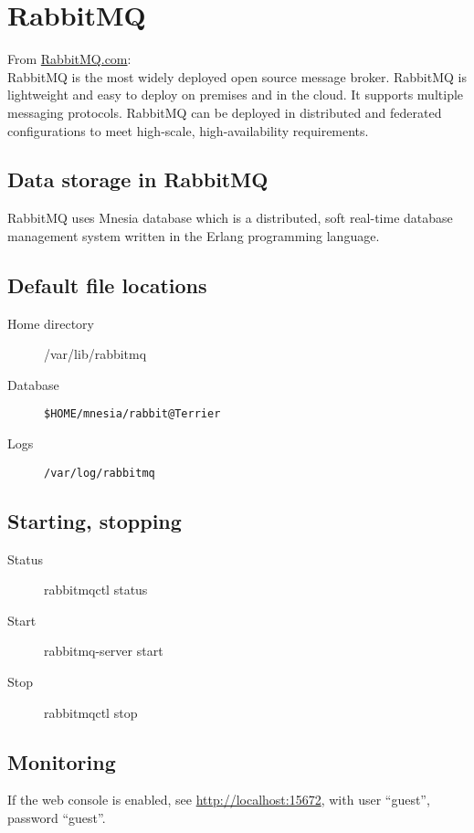 \section{RabbitMQ}
From \href{http://www.rabbitmq.com/}{RabbitMQ.com}: \hfill \\
RabbitMQ is the most widely deployed open source message broker.  RabbitMQ is lightweight and easy to deploy on premises and in the cloud. It supports multiple messaging protocols. RabbitMQ can be deployed in distributed and federated configurations to meet high-scale, high-availability requirements. 

	\subsection{Data storage in RabbitMQ}
	RabbitMQ uses Mnesia database which is a distributed, soft real-time database management system written in the Erlang programming language.

	\subsection{Default file locations}
	\begin{description}
		\item[Home directory] /var/lib/rabbitmq \\
		\item[Database] \verb+$HOME/mnesia/rabbit@Terrier+ \\
		\item[Logs] \verb+/var/log/rabbitmq+
	\end{description}



	\subsection{Starting, stopping}
	\begin{description}
		\item[Status] rabbitmqctl status
		\item[Start] rabbitmq-server start
		\item[Stop] rabbitmqctl stop
	\end{description}


	\subsection{Monitoring}
	If the web console is enabled, see \url{http://localhost:15672}, with user ``guest'', password ``guest''.